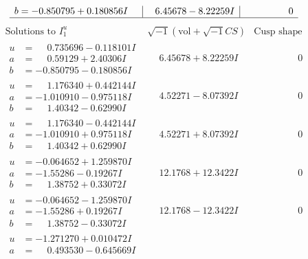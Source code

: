 \documentclass[1p]{elsarticle_modified}
\theoremstyle{definition}
\newcommand{\I}{\sqrt{-1}}
\begin{document}
$$\begin{array}{c|c|c}
\begin{aligned}
b &= -0.850795 + 0.180856 I\end{aligned}
 & \phantom{-}6.45678 - 8.22259 I & \phantom{-0.000000 } 0\\
 \hline 
 \end{array}$$\newpage$$\begin{array}{c|c|c}  
\text{Solutions to }I^u_{1}& \I (\text{vol} + \sqrt{-1}CS) & \text{Cusp shape}\\
 \hline 
\begin{aligned}
u &= \phantom{-}0.735696 - 0.118101 I \\
a &= \phantom{-}0.59129 + 2.40306 I \\
b &= -0.850795 - 0.180856 I\end{aligned}
 & \phantom{-}6.45678 + 8.22259 I & \phantom{-0.000000 } 0 \\ \hline\begin{aligned}
u &= \phantom{-}1.176340 + 0.442144 I \\
a &= -1.010910 - 0.975118 I \\
b &= \phantom{-}1.40342 - 0.62990 I\end{aligned}
 & \phantom{-}4.52271 - 8.07392 I & \phantom{-0.000000 } 0 \\ \hline\begin{aligned}
u &= \phantom{-}1.176340 - 0.442144 I \\
a &= -1.010910 + 0.975118 I \\
b &= \phantom{-}1.40342 + 0.62990 I\end{aligned}
 & \phantom{-}4.52271 + 8.07392 I & \phantom{-0.000000 } 0 \\ \hline\begin{aligned}
u &= -0.064652 + 1.259870 I \\
a &= -1.55286 - 0.19267 I \\
b &= \phantom{-}1.38752 + 0.33072 I\end{aligned}
 & \phantom{-}12.1768 + 12.3422 I & \phantom{-0.000000 } 0 \\ \hline\begin{aligned}
u &= -0.064652 - 1.259870 I \\
a &= -1.55286 + 0.19267 I \\
b &= \phantom{-}1.38752 - 0.33072 I\end{aligned}
 & \phantom{-}12.1768 - 12.3422 I & \phantom{-0.000000 } 0 \\ \hline\begin{aligned}
u &= -1.271270 + 0.010472 I \\
a &= \phantom{-}0.493530 - 0.645669 I \\

\end{aligned}
\end{array}$$
\end{document}
